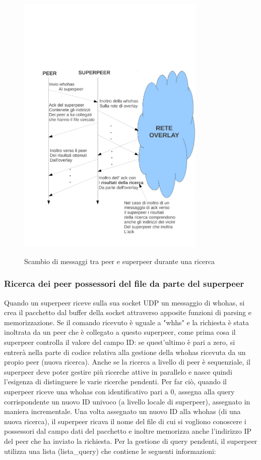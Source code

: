 \begin{figure}[h]
\centering
{\includegraphics[width=9cm]{img/scambio_msg_whhs}}
\caption{Scambio di messaggi tra peer e superpeer durante una ricerca}
\end{figure}
 
  
\subsubsection{Ricerca dei peer possessori del file da parte del superpeer}
Quando un superpeer riceve sulla sua socket UDP un messaggio di whohas, si crea il pacchetto dal buffer della socket attraverso apposite funzioni di parsing e memorizzazione. Se il comando ricevuto è uguale a "whhs" e la richiesta è stata inoltrata da un peer che è collegato a questo superpeer, come prima cosa il superpeer controlla il valore del campo ID: se quest'ultimo è pari a zero, si entrerà nella parte di codice relativa alla gestione della whohas ricevuta da un propio peer (nuova ricerca).\linebreak
Anche se la ricerca a livello di peer è sequenziale, il superpeer deve poter gestire più ricerche attive in parallelo e nasce quindi l'esigenza di distinguere le varie ricerche pendenti. Per far ciò, quando il superpeer riceve una whohas con identificativo pari a 0, assegna alla query corrispondente un nuovo ID univoco (a livello locale di superpeer), assegnato in maniera incrementale. \linebreak
Una volta assegnato un nuovo ID alla whohas (di una nuova ricerca), il superpeer ricava il nome del file di cui si vogliono conoscere i possessori dal campo dati del pacchetto e inoltre memorizza anche l'indirizzo IP del peer che ha inviato la richiesta. Per la gestione di query pendenti, il superpeer utilizza una lista (lista\_query) che contiene le seguenti informazioni:\linebreak

